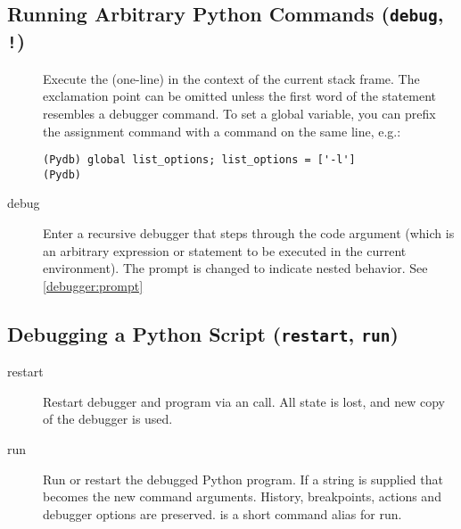 \subsection{Running Arbitrary Python Commands ({\tt debug}, {\tt !})\label{subsection-commands}}

\begin{description}

\item[\optional{!}]

Execute the (one-line)  in the context of
the current stack frame.
The exclamation point can be omitted unless the first word
of the statement resembles a debugger command.
To set a global variable, you can prefix the assignment
command with a  command on the same line, e.g.:

\begin{verbatim}
(Pydb) global list_options; list_options = ['-l']
(Pydb)
\end{verbatim}

\item[debug ]

Enter a recursive debugger that steps through the code argument (which
is an arbitrary expression or statement to be executed in the current
environment). The prompt is changed to indicate nested behavior. See
\ref{debugger:prompt}

\end{description}

\subsection{Debugging a Python Script ({\tt restart}, {\tt run})\label{subsection-restart}}

\begin{description}

\item[restart ]

Restart debugger and program via an  call. All state
is lost, and new copy of the debugger is used.

\item[run ]

Run or restart the debugged Python program. If a string is supplied
that becomes the new command arguments.  History, breakpoints, actions
and debugger options are preserved.   is a short command alias
for run.

\end{description}

